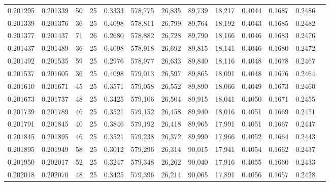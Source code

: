 \begin{tabular}{rrrrrrrrrrrrr}
0.201295 & 0.201339 &  50 &  25 &                                     0.3333 & 578,775 &  26,835 &  89,739 &  18,217 & 0.4044 & 0.1687 & 0.2486 \\
0.201339 & 0.201376 &  36 &  25 &                                     0.4098 & 578,811 &  26,799 &  89,764 &  18,192 & 0.4043 & 0.1685 & 0.2482 \\
0.201377 & 0.201437 &  71 &  26 &                                     0.2680 & 578,882 &  26,728 &  89,790 &  18,166 & 0.4046 & 0.1683 & 0.2476 \\
0.201437 & 0.201489 &  36 &  25 &                                     0.4098 & 578,918 &  26,692 &  89,815 &  18,141 & 0.4046 & 0.1680 & 0.2472 \\
0.201492 & 0.201535 &  59 &  25 &                                     0.2976 & 578,977 &  26,633 &  89,840 &  18,116 & 0.4048 & 0.1678 & 0.2467 \\
0.201537 & 0.201605 &  36 &  25 &                                     0.4098 & 579,013 &  26,597 &  89,865 &  18,091 & 0.4048 & 0.1676 & 0.2464 \\
0.201610 & 0.201671 &  45 &  25 &                                     0.3571 & 579,058 &  26,552 &  89,890 &  18,066 & 0.4049 & 0.1673 & 0.2460 \\
0.201673 & 0.201737 &  48 &  25 &                                     0.3425 & 579,106 &  26,504 &  89,915 &  18,041 & 0.4050 & 0.1671 & 0.2455 \\
0.201739 & 0.201789 &  46 &  25 &                                     0.3521 & 579,152 &  26,458 &  89,940 &  18,016 & 0.4051 & 0.1669 & 0.2451 \\
0.201791 & 0.201845 &  40 &  25 &                                     0.3846 & 579,192 &  26,418 &  89,965 &  17,991 & 0.4051 & 0.1667 & 0.2447 \\
0.201845 & 0.201895 &  46 &  25 &                                     0.3521 & 579,238 &  26,372 &  89,990 &  17,966 & 0.4052 & 0.1664 & 0.2443 \\
0.201895 & 0.201949 &  58 &  25 &                                     0.3012 & 579,296 &  26,314 &  90,015 &  17,941 & 0.4054 & 0.1662 & 0.2437 \\
0.201950 & 0.202017 &  52 &  25 &                                     0.3247 & 579,348 &  26,262 &  90,040 &  17,916 & 0.4055 & 0.1660 & 0.2433 \\
0.202018 & 0.202070 &  48 &  25 &                                     0.3425 & 579,396 &  26,214 &  90,065 &  17,891 & 0.4056 & 0.1657 & 0.2428 \\

\end{tabular}
